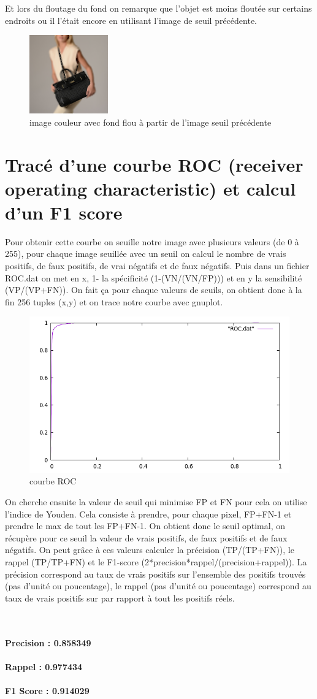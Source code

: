 \documentclass{article}
\begin{document}
Et lors du floutage du fond on remarque que l'objet est moins floutée sur certains endroits ou il l'était encore en utilisant l'image de seuil précédente.
\begin{figure}[h!]
\centerline{\includegraphics[scale=1.2]{./rendus/floufonderodila.png}}
\caption{image couleur avec fond flou à partir de l'image seuil précédente}
\end{figure}

\newpage
\section{Tracé d’une courbe ROC (receiver operating characteristic) et
calcul d’un F1 score}

Pour obtenir cette courbe on seuille notre image avec plusieurs valeurs (de 0 à 255), pour chaque image seuillée avec un seuil on calcul le nombre de vrais positifs, de faux positifs, de vrai négatifs et de faux négatifs.
Puis dans un fichier ROC.dat on met en x, 1- la spécificité (1-(VN/(VN/FP))) et en y la sensibilité (VP/(VP+FN)).
On fait ça pour chaque valeurs de seuils, on obtient donc à la fin 256 tuples (x,y) et on trace notre courbe avec gnuplot. 
\begin{figure}[h!]
\centerline{\includegraphics[scale=0.6]{./rendus/ROC.png}}
\caption{courbe ROC}
\end{figure}

On cherche ensuite la valeur de seuil qui minimise FP et FN pour cela on utilise l'indice de Youden.
Cela consiste à prendre, pour chaque pixel, FP+FN-1 et prendre le max de tout les FP+FN-1.
On obtient donc le seuil optimal, on récupère pour ce seuil la valeur de vrais positifs, de faux positifs et de faux négatifs.
On peut grâce à ces valeurs calculer la précision (TP/(TP+FN)), le rappel (TP/TP+FN) et le F1-score (2*precision*rappel/(precision+rappel)).
La précision correspond au taux de vrais positifs sur l'ensemble des positifs trouvés (pas d'unité ou poucentage), le rappel (pas d'unité ou poucentage) correspond au taux de vrais positifs sur par rapport à tout les positifs réels.

\textbf{\\\\Precision : 0.858349 \\\\ Rappel : 0.977434 \\\\ F1 Score : 0.914029}
\end{document}
